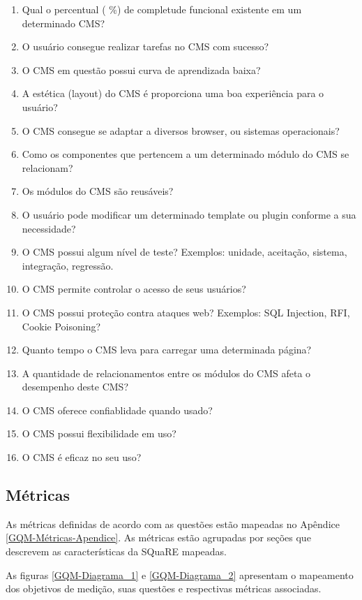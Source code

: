 \begin{enumerate}

\item Qual o percentual ( \%) de completude funcional existente em um determinado CMS?
\item O usuário consegue realizar tarefas no CMS com sucesso?
\item O CMS em questão possui curva de aprendizada baixa?
\item A estética (layout) do CMS é proporciona uma boa experiência para o usuário?
\item O CMS consegue se adaptar a diversos browser, ou sistemas operacionais?
\item Como os componentes que pertencem a um determinado módulo do CMS se relacionam?
\item Os módulos do CMS são reusáveis?
\item O usuário pode modificar um determinado template ou plugin conforme a sua necessidade?
\item O CMS possui algum nível de teste? Exemplos: unidade, aceitação, sistema, integração, regressão.
\item O CMS permite controlar o acesso de seus usuários?
\item O CMS possui proteção contra ataques web? Exemplos: SQL Injection, RFI, Cookie Poisoning?
\item Quanto tempo o CMS leva para carregar uma determinada página?
\item A quantidade de relacionamentos entre os módulos do CMS afeta o desempenho deste CMS?
\item O CMS oferece confiablidade quando usado?
\item O CMS possui flexibilidade em uso?
\item O CMS é eficaz no seu uso?




\end{enumerate}

\subsection{Métricas}
\label{GQM-Métricas}

As métricas definidas de acordo com as questões estão mapeadas no Apêndice \ref{GQM-Métricas-Apendice}. As métricas estão agrupadas por seções que descrevem as características da SQuaRE mapeadas.  

As figuras \ref{GQM-Diagrama_1} e \ref{GQM-Diagrama_2} apresentam o mapeamento dos objetivos de medição, suas questões e respectivas métricas associadas.

